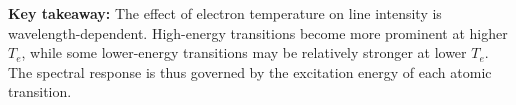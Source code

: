 \documentclass[12pt,a4paper]{article}
\begin{document}
	\textbf{Key takeaway:} The effect of electron temperature on line intensity is wavelength-dependent. High-energy transitions become more prominent at higher $T_e$, while some lower-energy transitions may be relatively stronger at lower $T_e$. The spectral response is thus governed by the excitation energy of each atomic transition.
	
	\newpage
	
	

	
\end{document}
